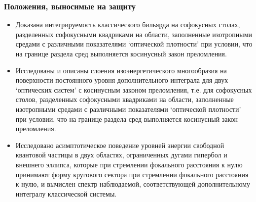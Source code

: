 %

\begin{frame}[t,allowframebreaks]
    \frametitle{Положения, выносимые на защиту}
\begin{itemize}
 \item Доказана интегрируемость классического бильярда на софокусных столах, разделенных софокусными квадриками на области, заполненные изотропными средами с различными показателями `оптической плотности' при условии, что на границе раздела сред выполняется косинусный закон преломления.
 \item Исследованы и описаны слоения изоэнергетического многообразия на поверхности постоянного уровня дополнительного интеграла для двух `оптических систем' с косинусным законом преломления, т.е. для софокусных столов, разделенных софокусными квадриками на области, заполненные изотропными средами с различными показателями `оптической плотности'  при условии, что на границе раздела сред выполняется косинусный закон преломления.
   \item Исследовано асимптотическое поведение уровней энергии свободной квантовой частицы в двух областях, ограниченных дугами гипербол и внешнего эллипса, которые при стремлении фокального расстояния к нулю принимают форму кругового сектора при стремлении фокального расстояния к нулю, и вычислен спектр наблюдаемой, соответствующей дополнительному интегралу классической системы.
\end{itemize}
\end{frame}

